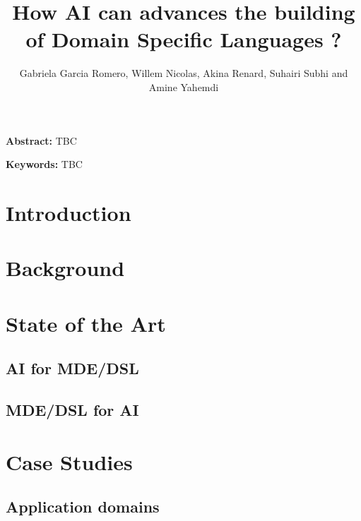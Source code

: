 \documentclass[11pt, oneside]{article}   	%
\title{\bf How AI can advances the building of Domain Specific Languages ?}
\author{Gabriela Garcia Romero, Willem Nicolas, Akina Renard, Suhairi Subhi and Amine Yahemdi }
\date{}							%
\begin{document}
\maketitle

{\noindent\small{\bf Abstract:} TBC}

\vspace{1ex}
{\noindent\small{\bf Keywords:}
   TBC}



\section{Introduction}


\section{Background}




\section{State of the Art}
\subsection{AI for MDE/DSL}


\subsection{MDE/DSL for AI}





\section{Case Studies}


\subsection{Application domains}



\end{document}
